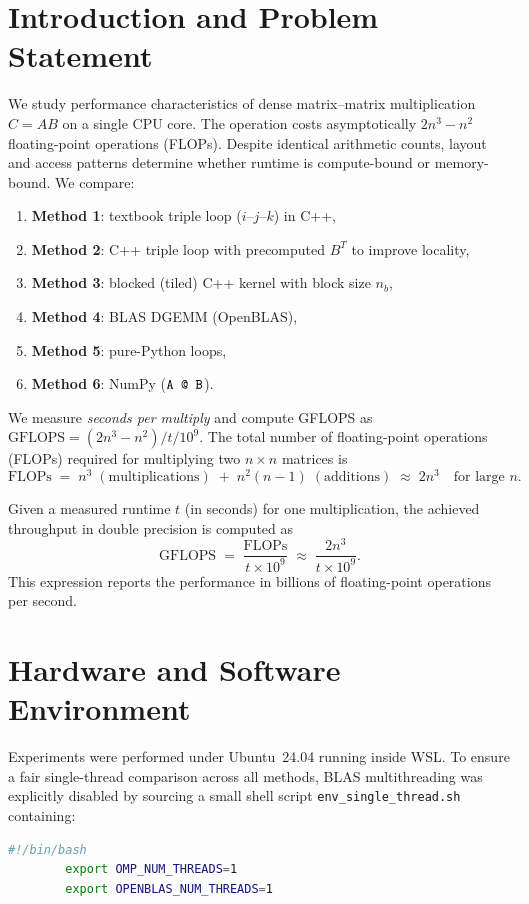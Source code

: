 \documentclass[11pt,a4paper]{article}
\begin{document}
	\section{Introduction and Problem Statement}
	We study performance characteristics of dense matrix–matrix multiplication $C=AB$ on a single CPU core. The operation costs asymptotically $2n^3-n^2$ floating-point operations (FLOPs). Despite identical arithmetic counts, layout and access patterns determine whether runtime is compute-bound or memory-bound. We compare:
	\begin{enumerate}
		\item \textbf{Method 1}: textbook triple loop ($i$–$j$–$k$) in C++,
		\item \textbf{Method 2}: C++ triple loop with precomputed $B^T$ to improve locality,
		\item \textbf{Method 3}: blocked (tiled) C++ kernel with block size $n_b$,
		\item \textbf{Method 4}: BLAS DGEMM (OpenBLAS),
		\item \textbf{Method 5}: pure-Python loops,
		\item \textbf{Method 6}: NumPy ($\verb|A @ B|$).
	\end{enumerate}
	We measure \emph{seconds per multiply} and compute GFLOPS as $\text{GFLOPS}=(2n^3-n^2)/t/10^9$.
	The total number of floating-point operations (FLOPs) required for
	multiplying two $n \times n$ matrices is
	\begin{equation}
		\label{eq:flops}
		\text{FLOPs} \;=\; n^3 \;(\text{multiplications}) \;+\; n^2(n-1) \;(\text{additions})
		\;\approx\; 2n^3 \quad \text{for large $n$}.
	\end{equation}
	
	Given a measured runtime $t$ (in seconds) for one multiplication, the achieved
	throughput in double precision is computed as
	\begin{equation}
		\label{eq:gflops}
		\text{GFLOPS} \;=\; \frac{\text{FLOPs}}{t \times 10^9}
		\;\approx\; \frac{2n^3}{t \times 10^9}.
	\end{equation}
	This expression reports the performance in billions of floating-point
	operations per second.
	
	\section{Hardware and Software Environment}
	Experiments were performed under Ubuntu~24.04 running inside WSL. 
	To ensure a fair single-thread comparison across all methods, BLAS 
	multithreading was explicitly disabled by sourcing a small shell 
	script \texttt{env\_single\_thread.sh} containing:
	\begin{lstlisting}[language=bash,caption={Single-thread environment setup (env\_single\_thread.sh).}]
		#!/bin/bash
		export OMP_NUM_THREADS=1
		export OPENBLAS_NUM_THREADS=1
	\end{lstlisting}
	
\end{document}
